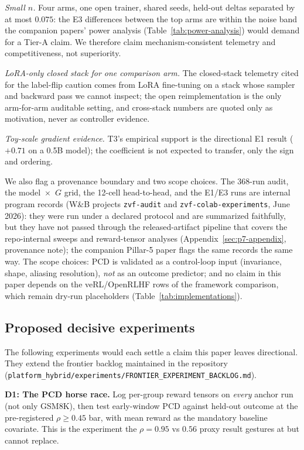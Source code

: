 \documentclass{article}
\providecommand{\tableref}[1]{Table~\ref{#1}}
\begin{document}
\emph{Small $n$.} Four arms, one open trainer, shared seeds, held-out
deltas separated by at most $0.075$: the E3 differences between the top
arms are within the noise band the companion papers' power analysis
(Table~\ref{tab:power-analysis}) would demand for a Tier-A claim. We
therefore claim mechanism-consistent telemetry and competitiveness, not
superiority.

\emph{LoRA-only closed stack for one comparison arm.} The closed-stack
telemetry cited for the label-flip caution comes from LoRA
\citep{hu2022lora} fine-tuning on a stack whose sampler and backward pass we
cannot inspect; the open reimplementation is the only arm-for-arm auditable
setting, and cross-stack numbers are quoted only as motivation, never as
controller evidence.

\emph{Toy-scale gradient evidence.} T3's empirical support is the
directional E1 result ($+0.71$ on a 0.5B model); the coefficient is not
expected to transfer, only the sign and ordering.

We also flag a provenance boundary and two scope choices. The 368-run
audit, the model~$\times$~$G$ grid, the 12-cell head-to-head, and the
E1/E3 runs are internal program records (W\&B projects \texttt{zvf-audit}
and \texttt{zvf-colab-experiments}, June 2026): they were run under a
declared protocol and are summarized faithfully, but they have not passed
through the released-artifact pipeline that covers the repo-internal
sweeps and reward-tensor analyses (Appendix~\ref{sec:p7-appendix},
provenance note); the companion Pillar-5 paper flags the same records the
same way. The scope choices: PCD is validated as a control-loop input
(invariance, shape, aliasing resolution), \emph{not} as an outcome
predictor; and no claim in this paper depends on the veRL/OpenRLHF rows of
the framework comparison, which remain dry-run placeholders
(\tableref{tab:implementations}).

\subsection{Proposed decisive experiments}
\label{sec:p7-proposed}
The following experiments would each settle a claim this paper leaves
directional. They extend the frontier backlog maintained in the repository
(\texttt{platform_hybrid/experiments/FRONTIER\_EXPERIMENT\_BACKLOG.md}).

\textbf{D1: The PCD horse race.} Log per-group reward tensors on
\emph{every} anchor run (not only GSM8K), then test early-window PCD
against held-out outcome at the pre-registered $\rho \geq 0.45$ bar, with
mean reward as the mandatory baseline covariate. This is the experiment the
$\rho = 0.95$ vs $0.56$ proxy result gestures at but cannot replace.
\end{document}
